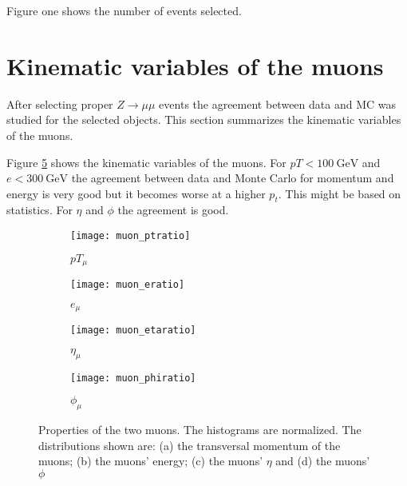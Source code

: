 Figure one shows the number of events selected. 

\section{Kinematic variables of the muons}

After selecting proper $Z \rightarrow \mu \mu$ events the agreement between data and MC was studied for the selected objects. This section summarizes the kinematic variables of the muons.

Figure \ref{fig:muons} shows the kinematic variables of the muons. For $pT<\SI{100}{\GeV}$ and $e<\SI{300}{\GeV}$ the agreement between data and Monte Carlo for momentum and energy is very good but it becomes worse at a higher $p_t$. This might be based on statistics. For $\eta$ and $\phi$ the agreement is good.





\begin{figure}[h]
\centering
\begin{subfigure}[b]{0.5\figwidth}
\texttt{[image: muon\_ptratio]}
\caption[Transversal momentum of the muons]{$pT_{\mu}$}
\label{fig:muonpt}
\end{subfigure}
\quad
\begin{subfigure}[b]{0.5\figwidth}
\texttt{[image: muon\_eratio]}
\caption[Energy of the muons]{$e_{\mu}$}
\label{fig:muone}
\end{subfigure}


\begin{subfigure}[b]{0.5\figwidth}
\texttt{[image: muon\_etaratio]}
\caption[$\eta$ of the muons]{$\eta_{\mu}$}
\label{fig:muoneta}
\end{subfigure}
\quad
\begin{subfigure}[b]{0.5\figwidth}
\texttt{[image: muon\_phiratio]}
\caption[$\phi$ of the muons]{$\phi_{\mu}$}
\label{fig:muonphi}
\end{subfigure}
\caption{Properties of the two muons. The histograms are normalized. The distributions shown are: (a) the transversal momentum of the muons; (b) the muons' energy; (c) the muons' $\eta$ and (d) the muons' $\phi$}
\label{fig:muons}
\end{figure}



